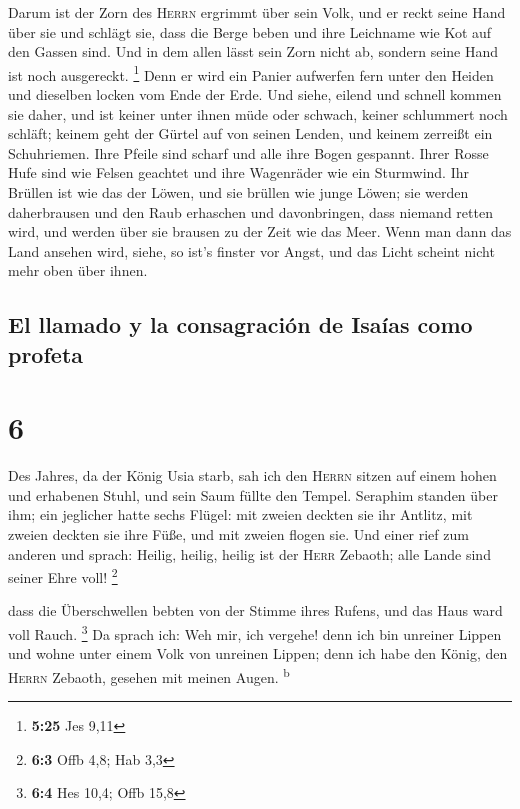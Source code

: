  Darum ist der Zorn des \textsc{Herrn} ergrimmt über sein
Volk, und er reckt seine Hand über sie und schlägt sie, dass die Berge
beben und ihre Leichname wie Kot auf den Gassen sind. Und in dem allen
lässt sein Zorn nicht ab, sondern seine Hand ist noch ausgereckt.
\footnote{\textbf{5:25} Jes 9,11}  Denn er wird ein
Panier aufwerfen fern unter den Heiden und dieselben locken vom Ende der
Erde. Und siehe, eilend und schnell kommen sie daher, 
und ist keiner unter ihnen müde oder schwach, keiner schlummert noch
schläft; keinem geht der Gürtel auf von seinen Lenden, und keinem
zerreißt ein Schuhriemen.  Ihre Pfeile sind scharf und
alle ihre Bogen gespannt. Ihrer Rosse Hufe sind wie Felsen geachtet und
ihre Wagenräder wie ein Sturmwind.  Ihr Brüllen ist wie
das der Löwen, und sie brüllen wie junge Löwen; sie werden daherbrausen
und den Raub erhaschen und davonbringen, dass niemand retten wird,
 und werden über sie brausen zu der Zeit wie das Meer.
Wenn man dann das Land ansehen wird, siehe, so ist's finster vor Angst,
und das Licht scheint nicht mehr oben über ihnen.

\hypertarget{el-llamado-y-la-consagraciuxf3n-de-isauxedas-como-profeta}{%
\subsection{El llamado y la consagración de Isaías como
profeta}\label{el-llamado-y-la-consagraciuxf3n-de-isauxedas-como-profeta}}

\hypertarget{section-5}{%
\section{6}\label{section-5}}

 Des Jahres, da der König Usia starb, sah ich den
\textsc{Herrn} sitzen auf einem hohen und erhabenen Stuhl, und sein Saum
füllte den Tempel.  Seraphim standen über ihm; ein
jeglicher hatte sechs Flügel: mit zweien deckten sie ihr Antlitz, mit
zweien deckten sie ihre Füße, und mit zweien flogen sie. 
Und einer rief zum anderen und sprach: Heilig, heilig, heilig ist der
\textsc{Herr} Zebaoth; alle Lande sind seiner Ehre voll! \footnote{\textbf{6:3}
  Offb 4,8; Hab 3,3}

 dass die Überschwellen bebten von der Stimme ihres
Rufens, und das Haus ward voll Rauch. \footnote{\textbf{6:4} Hes 10,4;
  Offb 15,8}  Da sprach ich: Weh mir, ich vergehe! denn
ich bin unreiner Lippen und wohne unter einem Volk von unreinen Lippen;
denn ich habe den König, den \textsc{Herrn} Zebaoth, gesehen mit meinen
Augen. \textsuperscript{b}

